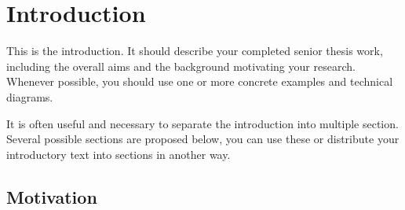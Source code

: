 \chapter{Introduction}
\label{ch:intro}

This is the introduction. It should describe your completed senior thesis work, including the overall aims and the background motivating your research. Whenever possible, you should use one or more concrete examples
and technical diagrams. 

It is often useful and necessary to separate the introduction into multiple section. Several possible sections are proposed below, you can use these or distribute your introductory text into sections in another way. 

\section{Motivation} 
\label{sec:motivation}

